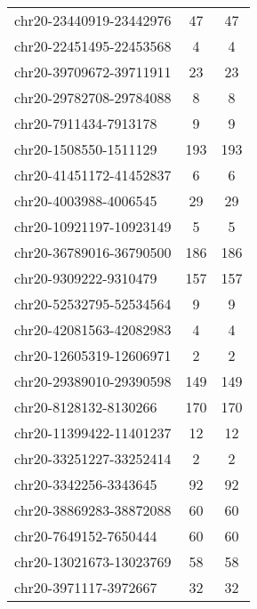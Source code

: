 \begin{longtable}{lSS}
	chr20-23440919-23442976 & 47     & 47                                  \\
	chr20-22451495-22453568 & 4      & 4                                   \\
	chr20-39709672-39711911 & 23     & 23                                  \\
	chr20-29782708-29784088 & 8      & 8                                   \\
	chr20-7911434-7913178   & 9      & 9                                   \\
	chr20-1508550-1511129   & 193    & 193                                 \\
	chr20-41451172-41452837 & 6      & 6                                   \\
	chr20-4003988-4006545   & 29     & 29                                  \\
	chr20-10921197-10923149 & 5      & 5                                   \\
	chr20-36789016-36790500 & 186    & 186                                 \\
	chr20-9309222-9310479   & 157    & 157                                 \\
	chr20-52532795-52534564 & 9      & 9                                   \\
	chr20-42081563-42082983 & 4      & 4                                   \\
	chr20-12605319-12606971 & 2      & 2                                   \\
	chr20-29389010-29390598 & 149    & 149                                 \\
	chr20-8128132-8130266   & 170    & 170                                 \\
	chr20-11399422-11401237 & 12     & 12                                  \\
	chr20-33251227-33252414 & 2      & 2                                   \\
	chr20-3342256-3343645   & 92     & 92                                  \\
	chr20-38869283-38872088 & 60     & 60                                  \\
	chr20-7649152-7650444   & 60     & 60                                  \\
	chr20-13021673-13023769 & 58     & 58                                  \\
	chr20-3971117-3972667   & 32     & 32                                  \\

\end{longtable}
